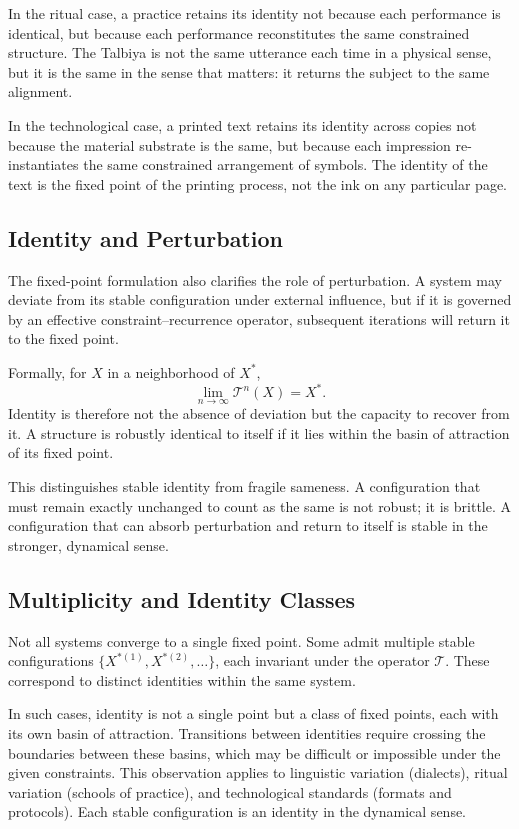 \documentclass[12pt, oneside]{article}
\theoremstyle{definition}
\theoremstyle{remark}
\begin{document}
In the ritual case, a practice retains its identity not because each performance is identical, but because each performance reconstitutes the same constrained structure.
The Talbiya is not the same utterance each time in a physical sense, but it is the same in the sense that matters: it returns the subject to the same alignment.

In the technological case, a printed text retains its identity across copies not because the material substrate is the same, but because each impression re-instantiates the same constrained arrangement of symbols.
The identity of the text is the fixed point of the printing process, not the ink on any particular page.

\subsection{Identity and Perturbation}

The fixed-point formulation also clarifies the role of perturbation.
A system may deviate from its stable configuration under external influence, but if it is governed by an effective constraint--recurrence operator, subsequent iterations will return it to the fixed point.

Formally, for $X$ in a neighborhood of $X^{*}$,
\[
\lim_{n \to \infty} \mathcal{T}^{n}(X) = X^{*}.
\]
Identity is therefore not the absence of deviation but the capacity to recover from it.
A structure is robustly identical to itself if it lies within the basin of attraction of its fixed point.

This distinguishes stable identity from fragile sameness.
A configuration that must remain exactly unchanged to count as the same is not robust; it is brittle.
A configuration that can absorb perturbation and return to itself is stable in the stronger, dynamical sense.

\subsection{Multiplicity and Identity Classes}

Not all systems converge to a single fixed point.
Some admit multiple stable configurations $\{X^{*(1)}, X^{*(2)}, \ldots\}$, each invariant under the operator $\mathcal{T}$.
These correspond to distinct identities within the same system.

In such cases, identity is not a single point but a class of fixed points, each with its own basin of attraction.
Transitions between identities require crossing the boundaries between these basins, which may be difficult or impossible under the given constraints.
This observation applies to linguistic variation (dialects), ritual variation (schools of practice), and technological standards (formats and protocols).
Each stable configuration is an identity in the dynamical sense.
\end{document}
